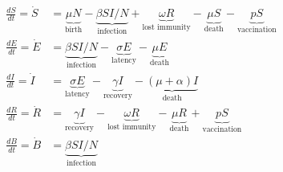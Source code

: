 \begin{align*}

\frac{dS}{dt} = \dot{S}  &= \underbrace{\mu N}_\textrm{birth} - \underbrace{\beta S I / N}_\textrm{infection} + \underbrace{\omega R}_\textrm{lost immunity} - \underbrace{ \mu S}_\text{death} - \underbrace{p S}_\text{vaccination} 

\\

\frac{dE}{dt} = \dot{E} &=  \underbrace{\beta S I / N}_\textrm{infection} - \underbrace{\sigma E}_\textrm{latency} - \underbrace{\mu E}_\text{death}

\\

\frac{dI}{dt} = \dot{I} &=  \underbrace{\sigma E}_\textrm{latency} - \underbrace{\gamma I}_\text{recovery} - \underbrace{(\mu + \alpha)I}_\text{death}

\\

\frac{dR}{dt} = \dot{R} &= \underbrace{\gamma I}_\textrm{recovery} - \underbrace{\omega R}_\textrm{lost immunity}  - \underbrace{\mu R}_\textrm{death} + \underbrace{p S}_\textrm{vaccination} 

\\

\frac{dB}{dt} = \dot{B} &= \underbrace{\beta S I / N}_\textrm{infection}

\end{align*}
